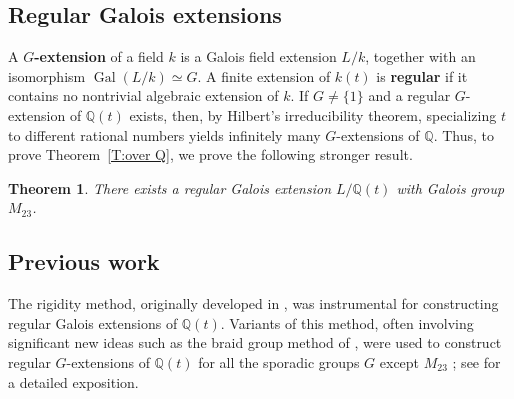 \documentclass[12pt,reqno]{amsart}
\newcommand{\deficolor}{ForestGreen}
\newcommand{\defi}[1]{\textbf{\color{\deficolor} #1}} %
\newcommand{\Q}{\mathbb{Q}}
\DeclareMathOperator{\Gal}{Gal}
\newcommand{\isom}{\simeq}
\newtheorem{theorem}{Theorem}[section]
\theoremstyle{definition}
\theoremstyle{remark}
\begin{document}


\subsection{Regular Galois extensions}

A \defi{$G$-extension} of a field $k$ is a Galois field extension $L/k$, together with an isomorphism 
$\Gal(L/k) \isom G$.
A finite extension of $k(t)$ is \defi{regular} if it contains no nontrivial algebraic extension of $k$.
If $G \ne \{1\}$ and a regular $G$-extension of $\Q(t)$ exists,
then, by Hilbert's irreducibility theorem, 
specializing $t$ to different rational numbers yields infinitely many $G$-extensions of $\Q$.
Thus, to prove Theorem~\ref{T:over Q}, we prove the following stronger result. 


\begin{theorem}
\label{T:over Q(t)}
There exists a regular Galois extension $L/\Q(t)$ with Galois group $M_{23}$.
\end{theorem}


\subsection{Previous work}
\label{S:previous}

The rigidity method, originally developed in \cite{Shih1974,Fried1977,Belyi1979,Matzat1979,Matzat1984,Matzat1985a,Thompson1984},
was instrumental for constructing regular Galois extensions of $\Q(t)$.
Variants of this method, often involving significant new ideas such as the braid group method of \cite{Matzat1989,Matzat1991,Fried-Voelklein1991}, were used to construct regular $G$-extensions of $\Q(t)$ for all the sporadic groups $G$ except $M_{23}$ \cite{Thompson1984,Matzat1985a,Hoyden-Siedersleben1985, Hunt1986, Hoyden-Siedersleben-Matzat1986, Matzat-Zeh-Marschke1986, Matzat-Zeh-Marschke1987, Malle88,
Pahlings1988,Pahlings1989}; see \cite[II.9]{Malle-Matzat2018} for a detailed exposition.
\end{document}
